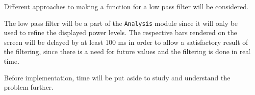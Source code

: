 Different approaches to making a function for a low pass filter will be considered.

The low pass filter will be a part of the \verb=Analysis= module since it will only be used to refine the displayed power levels. The respective bars rendered on the screen will be delayed by at least 100 ms in order to allow a satisfactory result of the filtering, since there is a need for future values and the filtering is done in real time.

Before implementation, time will be put aside to study and understand the problem further.
